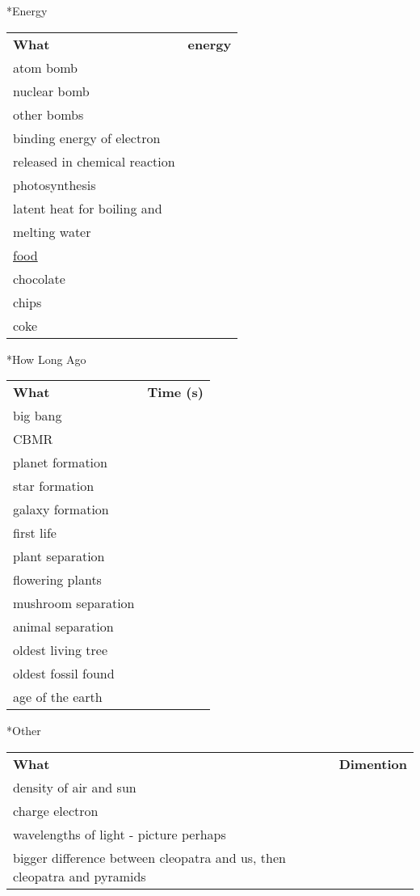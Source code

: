 \documentclass[8pt,a4paper]{extarticle}
\begin{document}
\pagebreak
\begin{section}
*{Energy}

\begin{tabular}{l l}
\bf{What} & \bf{energy}\\
atom bomb\\
nuclear bomb\\
other bombs\\

binding energy of electron\\
released in chemical reaction\\
photosynthesis\\
latent heat for boiling and\\
\indent melting water\\


\underline{food}\\
chocolate\\
chips\\
coke\\



\end{tabular}
\end{section}

\pagebreak
\begin{section}
*{How Long Ago}
\begin{tabular}{l l}
\bf{What} & \bf{Time (s)}\\
big bang\\
CBMR\\
planet formation\\
star formation\\
galaxy formation\\
first life\\
plant separation\\
flowering plants\\
mushroom separation\\
animal separation\\
oldest living tree\\
oldest fossil found\\
age of the earth\\

\end{tabular}
\end{section}

\pagebreak
\begin{section}
*{Other}

\begin{tabular}{l l}
\bf{What} & \bf{Dimention}\\
density of air and sun\\
charge electron\\
wavelengths of light - picture perhaps\\
bigger difference between cleopatra and us, then cleopatra and pyramids\\

\end{tabular}
\end{section}
\end{document}
